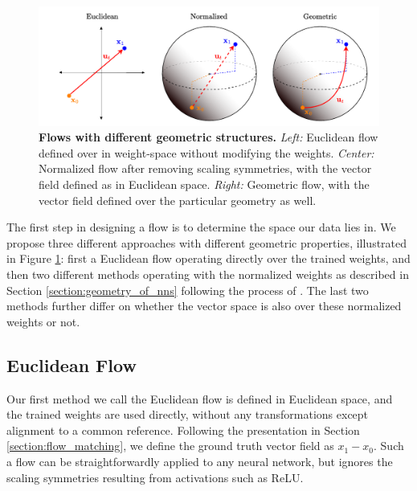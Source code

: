 \begin{figure}[h!]
    \centering
    \includegraphics[width=\textwidth]{figures/flow_types.drawio.pdf}
    \caption{\label{fig:flow_types}\textbf{Flows with different geometric structures.} \textit{Left:} Euclidean flow defined over in weight-space without modifying the weights. \textit{Center:} Normalized flow after removing scaling symmetries, with the vector field defined as in Euclidean space. \textit{Right:} Geometric flow, with the vector field defined over the particular geometry as well.}
\end{figure}

The first step in designing a flow is to determine the space our data lies in. We propose three different approaches with different geometric properties, illustrated in Figure \ref{fig:flow_types}: first a Euclidean flow operating directly over the trained weights, and then two different methods operating with the normalized weights as described in Section \ref{section:geometry_of_nns} following the process of \citep{pittorinoDeepNetworksToroids2022}. The last two methods further differ on whether the vector space is also over these normalized weights or not. 

\subsection{Euclidean Flow}

Our first method we call the Euclidean flow is defined in Euclidean space, and the trained weights are used directly, without any transformations except alignment to a common reference.  Following the presentation in Section \ref{section:flow_matching}, we define the ground truth vector field as $x_1 - x_0$. Such a flow can be straightforwardly applied to any neural network, but ignores the scaling symmetries resulting from activations such as ReLU. 

